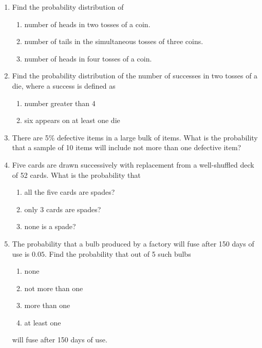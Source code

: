 \begin{enumerate}[label=\thesection.\arabic*,ref=\thesection.\theenumi]
		\\
	\solution

\item Find the probability distribution of
\begin{enumerate}
	\item number of heads in two tosses of a coin.
	\item number of tails in the simultaneous tosses of three coins.
	\item number of heads in four tosses of a coin.
\end{enumerate}
\solution

\item Find the probability distribution of the number of successes in two tosses of a die,
where a success is defined as\\
\begin{enumerate}
\item number greater than 4
\item six appears on at least one die
\end{enumerate}
\solution

\item There are 5\% defective items in a large bulk of items. What is the probability that a sample of 10 items will include not more than one defective item?
	\\
\solution

\item Five cards are drawn successively with replacement from a well-shuffled deck
of 52 cards. What is the probability that
\begin{enumerate}
    \item all the five cards are spades?
    \item only 3 cards are spades?
    \item none is a spade?
\end{enumerate}
\solution

\item The probability that a bulb produced by a factory will fuse after 150 days of use
is $0.05$. Find the probability that out of 5 such bulbs
\begin{enumerate}
\item  none
\item not more than one
\item more than one
\item at least one
\end{enumerate}
will fuse after 150 days of use.
\\
\solution

\end{enumerate}

